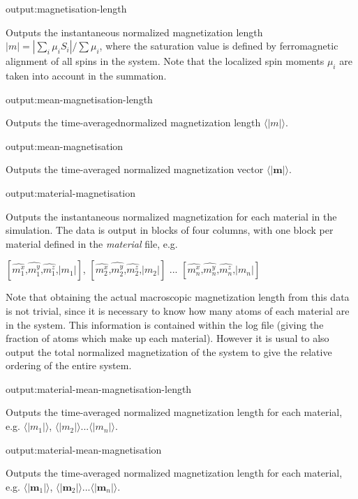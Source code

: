 {\zicf output:magnetisation-length} Outputs the instantaneous normalized magnetization length $|m| = |\sum_i \mu_i S_i| / \sum \mu_i$, where the saturation value is defined by ferromagnetic alignment of all spins in the system. Note that the localized spin moments $\mu_i$ are taken into account in the summation.

{\zicf output:mean-magnetisation-length} Outputs the time-averaged\newline normalized magnetization length $\langle|m|\rangle$.

{\zicf output:mean-magnetisation} Outputs the time-averaged normalized magnetization vector $\langle|\mathbf{m}|\rangle$.

{\zicf output:material-magnetisation} Outputs the instantaneous normalized magnetization for each material in the simulation. The data is output in blocks of four columns, with one block per material defined in
the \textit{material} file, e.g.

\begin{center}
$\left[ \hat{m_1^x} \textrm{,} \hat{m_1^y} \textrm{,} \hat{m_1^z} \textrm{,} |m_1| \right]$,
$\left[ \hat{m_2^x} \textrm{,} \hat{m_2^y} \textrm{,} \hat{m_2^z} \textrm{,} |m_2| \right]$ ...
$\left[ \hat{m_n^x} \textrm{,} \hat{m_n^y} \textrm{,} \hat{m_n^z} \textrm{,} |m_n| \right]$
\end{center}

Note that obtaining the actual macroscopic magnetization length from this data is not trivial, since it is necessary to know how many atoms of each material are in the system. This information is contained within the log file (giving the fraction of atoms which make up each material). However it is usual to also output the total normalized magnetization of the system to give the relative ordering of the entire system.

{\zicf output:material-mean-magnetisation-length}
Outputs the time-averaged normalized magnetization length for each material, e.g. $\langle|m_1|\rangle$, $\langle|m_2|\rangle$...$\langle|m_n|\rangle$.

{\zicf output:material-mean-magnetisation} Outputs the time-averaged normalized magnetization length for each material, e.g. $\langle|\mathbf{m}_1|\rangle$, $\langle|\mathbf{m}_2|\rangle$...$\langle|\mathbf{m}_n|\rangle$.

